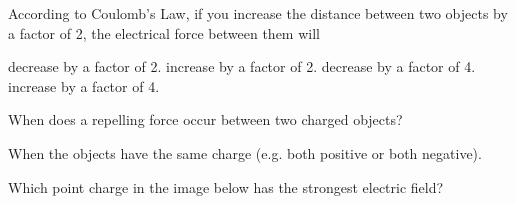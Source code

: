 \documentclass[answers]{exam}
\begin{document}
\begin{questions}
\question
According to Coulomb’s Law, if you increase the distance between two objects by a factor of 2, the electrical force between them will

\begin{randomizechoices}
    \choice decrease by a factor of 2.
    \choice increase by a factor of 2.
    \correctchoice decrease by a factor of 4.
    \choice increase by a factor of 4.
\end{randomizechoices}


\question
When does a repelling force occur between two charged objects? 

\ifprintanswers
{\color{red}
When the objects have the same charge (e.g. both positive or both negative).
}
\else
\fillwithlines{1.5cm}
\fi

\question
Which point charge in the image below has the strongest electric field? \fillin[C]

\begin{center}
\hspace{1cm}
\hspace{1cm}
\end{center}



\end{questions}
\end{document}
